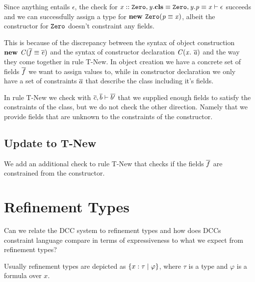 \documentclass[a4paper]{article}
\begin{document}
Since anything entails $\epsilon$, the check for
$\entails{\instanceOf{x}{\Zero}, \instantiatedBy{y}{\Zero}, \pathEq{y.p}{x}}{\epsilon}$
succeeds and we can successfully assign a type for $\objConstr{\Zero}{\pathEq{p}{x}}$,
albeit the constructor for $\Zero$ doesn't constraint any fields.

This is because of the discrepancy between the syntax of object construction $\objConstr{C}{\pathEq{\ovl{f}}{\ovl{e}}}$
and the syntax of constructor declaration $\constructorDeclaration{C}{x}{\ovl{a}}$ and the way they come together
in rule T-New.
In object creation we have a concrete set of fields $\ovl{f}$ we want to assign values to,
while in constructor declaration we only have a set of constraints $\ovl{a}$
that describe the class including it's fields.

In rule T-New we check with $\entails{\ovl{c},\ovl{b}}{\ovl{b'}}$ that we supplied enough fields
to satisfy the constraints of the class, but we do not check the other direction.
Namely that we provide fields that are unknown to the constraints of the constructor.

\subsection{Update to T-New}
We add an additional check to rule T-New that checks if the fields $\ovl{f}$ are
constrained from the constructor.

\begin{mathpar}
\end{mathpar}

\section{Refinement Types}
Can we relate the DCC system to refinement types and
how does DCCs constraint language compare in terms of expressiveness to what
we expect from refinement types?

Usually refinement types are depicted as $\refT{x}{\tau}{\varphi}$,
where $\tau$ is a type and $\varphi$ is a formula over $x$.
\end{document}
